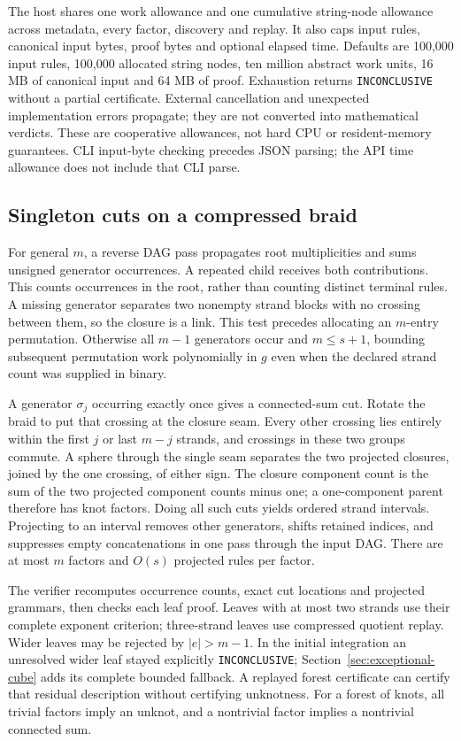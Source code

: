 The host shares one work allowance and one cumulative string-node allowance
across metadata, every factor, discovery and replay. It also caps input rules,
canonical input bytes, proof bytes and optional elapsed time. Defaults are
100,000 input rules, 100,000 allocated string nodes, ten million abstract work
units, 16 MB of canonical input and 64 MB of proof. Exhaustion returns
\texttt{INCONCLUSIVE} without a partial certificate. External cancellation
and unexpected implementation errors propagate; they are not converted into
mathematical verdicts. These are cooperative allowances, not hard CPU or
resident-memory guarantees. CLI input-byte checking precedes JSON parsing;
the API time allowance does not include that CLI parse.

\subsection{Singleton cuts on a compressed braid}

For general $m$, a reverse DAG pass propagates root multiplicities and sums
unsigned generator occurrences. A repeated child receives both contributions.
This counts occurrences in the root, rather than counting distinct terminal
rules. A missing generator separates two nonempty strand blocks with no
crossing between them, so the closure is a link. This test precedes allocating
an $m$-entry permutation. Otherwise all $m-1$ generators occur and
$m\le s+1$, bounding subsequent permutation work polynomially in $g$ even
when the declared strand count was supplied in binary.

A generator $\sigma_j$ occurring exactly once gives a connected-sum cut.
Rotate the braid to put that crossing at the closure seam. Every other
crossing lies entirely within the first $j$ or last $m-j$ strands, and
crossings in these two groups commute. A sphere through the single seam
separates the two projected closures, joined by the one crossing, of either
sign. The closure component count is the sum of the two projected component
counts minus one; a one-component parent therefore has knot factors.
Doing all such cuts yields ordered strand intervals. Projecting to an
interval removes other generators, shifts retained indices, and suppresses
empty concatenations in one pass through the input DAG. There are at most
$m$ factors and $O(s)$ projected rules per factor.

The verifier recomputes occurrence counts, exact cut locations and projected
grammars, then checks each leaf proof. Leaves with at most two strands use
their complete exponent criterion; three-strand leaves use compressed quotient
replay. Wider leaves may be rejected by $|e|>m-1$. In the initial integration an
unresolved wider leaf stayed explicitly \texttt{INCONCLUSIVE};
Section~\ref{sec:exceptional-cube} adds its complete bounded fallback.
A replayed forest certificate can
certify that residual description without certifying unknotness. For a forest
of knots, all trivial factors imply an unknot, and a nontrivial factor implies
a nontrivial connected sum.

